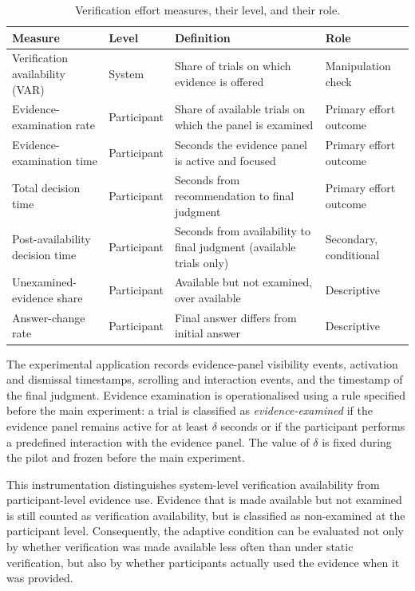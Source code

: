 \documentclass[oneside,final,14pt,a4paper]{extreport}
\begin{document}
\begin{table}[t]
\centering
\caption{Verification effort measures, their level, and their role.}
\label{tab:measures}
\small
\begin{tabular}{@{}>{\raggedright\arraybackslash}p{3.9cm}>{\raggedright\arraybackslash}p{1.9cm}>{\raggedright\arraybackslash}p{5.5cm}>{\raggedright\arraybackslash}p{2.7cm}@{}}
\toprule
Measure & Level & Definition & Role \\
\midrule
Verification availability (VAR) & System &
Share of trials on which evidence is offered & Manipulation check \\
Evidence-examination rate & Participant &
Share of available trials on which the panel is examined &
Primary effort outcome \\
Evidence-examination time & Participant &
Seconds the evidence panel is active and focused & Primary effort outcome \\
Total decision time & Participant &
Seconds from recommendation to final judgment & Primary effort outcome \\
Post-availability decision time & Participant &
Seconds from availability to final judgment (available trials only) &
Secondary, conditional \\
Unexamined-evidence share & Participant &
Available but not examined, over available & Descriptive \\
Answer-change rate & Participant &
Final answer differs from initial answer & Descriptive \\
\bottomrule
\end{tabular}
\end{table}

The experimental application records evidence-panel visibility events, 
activation and dismissal timestamps, scrolling and interaction events, 
and the timestamp of the final judgment. Evidence examination is 
operationalised using a rule specified before the main experiment: a trial 
is classified as \emph{evidence-examined} if the evidence panel remains 
active for at least $\delta$ seconds or if the participant performs a 
predefined interaction with the evidence panel. The value of $\delta$ is 
fixed during the pilot and frozen before the main experiment.

This instrumentation distinguishes system-level verification availability 
from participant-level evidence use. Evidence that is made available but 
not examined is still counted as verification availability, but is classified 
as non-examined at the participant level. Consequently, the adaptive condition 
can be evaluated not only by whether verification was made available less often 
than under static verification, but also by whether participants actually 
used the evidence when it was provided.
\end{document}
